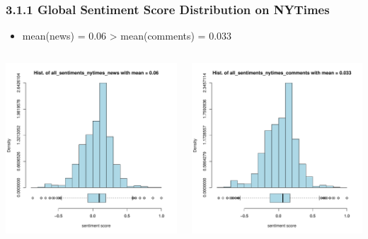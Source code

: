 \documentclass{tum-presentation}
\begin{document}
\begin{frame}
  \frametitle{3.1.1 Global Sentiment Score Distribution on NYTimes}
  \begin{itemize}
    \item mean(news) = 0.06 > mean(comments) = 0.033
 \end{itemize}
  \begin{columns}
    \begin{minipage}[c]{\linewidth}
        \centering
        \includegraphics[width=0.8\linewidth]{figures/overview_all_sentiments_nytimes_news.pdf}
    \end{minipage}
    \begin{minipage}[c]{\linewidth}
        \centering
        \includegraphics[width=0.8\linewidth]{figures/overview_all_sentiments_nytimes_comments.pdf}
    \end{minipage}
    
\end{columns}
\end{frame}
\end{document}
